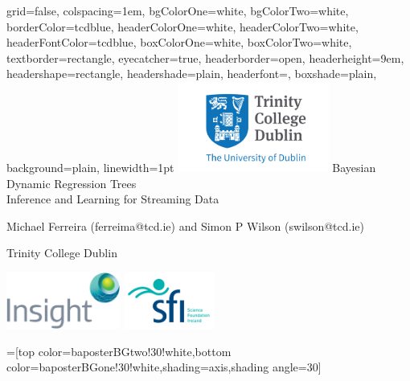 \documentclass[a1paper,portrait, fontscale=0.45]{baposter}
\begin{document}
\newlength{\leftimgwidth}
\begin{poster}%
  {
  grid=false,
  colspacing=1em,
  bgColorOne=white,
  bgColorTwo=white,
  borderColor=tcdblue,
  headerColorOne=white,
  headerColorTwo=white,
  headerFontColor=tcdblue,
  boxColorOne=white,
  boxColorTwo=white,
  textborder=rectangle,
  eyecatcher=true,
  headerborder=open,
  headerheight=9em, %
  headershape=rectangle,
  headershade=plain,
  headerfont=\normalsize,
  boxshade=plain,
  background=plain,
  linewidth=1pt
  }
  {\includegraphics[height=8em]{trinity-stacked.jpg}}
  {
  {\Huge Bayesian Dynamic Regression Trees} \\
  {\Large Inference and Learning for Streaming Data}
  }
  {  
  {\large Michael Ferreira {\smaller (ferreima@tcd.ie)}} {\large and Simon P Wilson {\smaller (swilson@tcd.ie)}}
  
  \vspace{0.2em}
  {\large Trinity College Dublin}
  }
  {
      \begin{minipage}{9em}
       \hfill
        \includegraphics[height=5em]{insight.png}
        \includegraphics[height=5em]{SFI_logo_stacked_en.jpg}
      \end{minipage}
  }

  =[top color=baposterBGtwo!30!white,bottom color=baposterBGone!30!white,shading=axis,shading angle=30]

   \setlength{\leftimgwidth}{0.78em+8.0em}


\end{poster}
\end{document}
